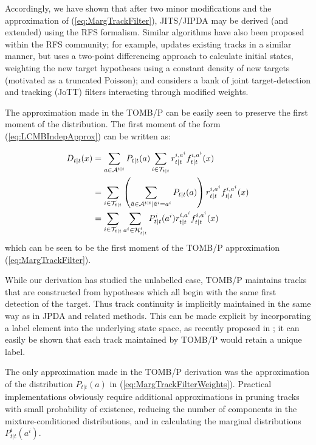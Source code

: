 \documentclass[journal,twoside]{IEEEtran}
\theoremstyle{plain}
\begin{document}
Accordingly, we have shown that after two minor modifications and the approximation of (\ref{eq:MargTrackFilter}), JITS/JIPDA may be derived (and extended) using the RFS formalism. Similar algorithms have also been proposed within the RFS community; for example, \cite{MorCha03} updates existing tracks in a similar manner, but uses a two-point differencing approach to calculate initial states, weighting the new target hypotheses using a constant density of new targets (motivated as a truncated Poisson); and \cite{RisVo10} considers a bank of joint target-detection and tracking (JoTT) filters interacting through modified weights. 

The approximation made in the TOMB/P can be easily seen to preserve the first moment of the distribution. The first moment of the form (\ref{eq:LCMBIndepApprox}) can be written as:

\begin{align}
D_{t|t}(x) &= \sum_{a\in{\cal A}^{t|t}} P_{t|t}(a) \sum_{i\in{\cal T}_{t|t}}r_{t|t}^{i,a^i}f_{t|t}^{i,a^i}(x)  \\
& = \sum_{i\in{\cal T}_{t|t}} \left(\sum_{\tilde{a}\in{\cal A}^{t|t}|\tilde{a}^i=a^i} P_{t|t}(a)\right) r_{t|t}^{i,a^i}f_{t|t}^{i,a^i}(x)  \\
&= \sum_{i\in{\cal T}_{t|t}} \sum_{a^i\in{\cal H}^i_{t|t}} P^i_{t|t}(a^i) r_{t|t}^{i,a^i}f_{t|t}^{i,a^i}(x) 
\label{eq:TOMBFirstMoment}
\end{align}
%
which can be seen to be the first moment of the TOMB/P approximation (\ref{eq:MargTrackFilter}).

While our derivation has studied the unlabelled case, TOMB/P maintains tracks that are constructed from hypotheses which all begin with the same first detection of the target. Thus track continuity is implicitly maintained in the same way as in JPDA and related methods. This can be made explicit by incorporating a label element into the underlying state space, as recently proposed in \cite{VoVo13}; it can easily be shown that each track maintained by TOMB/P would retain a unique label. 

The only approximation made in the TOMB/P derivation was the approximation of the distribution $P_{t|t}(a)$ in (\ref{eq:MargTrackFilterWeights}). Practical implementations obviously require additional approximations in pruning tracks with small probability of existence, reducing the number of components in the mixture-conditioned distributions, and in calculating the marginal distributions $P_{t|t}^i(a^i)$. 
\end{document}
